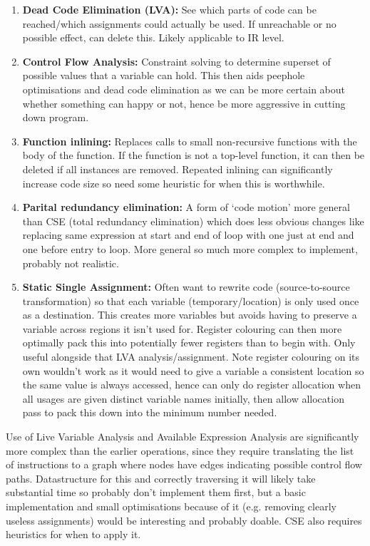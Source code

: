 \documentclass[10pt,twoside,a4paper]{article}
\begin{document}
\begin{enumerate}
\item \textbf{Dead Code Elimination (LVA): }See which parts of code can be reached/which assignments could actually be used. If unreachable or no possible effect, can delete this. Likely applicable to IR level.

\item \textbf{Control Flow Analysis: } Constraint solving to determine superset of possible values that a variable can hold. This then aids peephole optimisations and dead code elimination as we can be more certain about whether something can happy or not, hence be more aggressive in cutting down program.

\item \textbf{Function inlining: } Replaces calls to small non-recursive functions with the body of the function. If the function is not a top-level function, it can then be deleted if all instances are removed. Repeated inlining can significantly increase code size so need some heuristic for when this is worthwhile.

\item \textbf{Parital redundancy elimination: } A form of `code motion' more general than CSE (total redundancy elimination) which does less obvious changes like replacing same expression at start and end of loop with one just at end and one before entry to loop. More general so much more complex to implement, probably not realistic. 

\item \textbf{Static Single Assignment: }Often want to rewrite code (source-to-source transformation) so that each variable (temporary/location) is only used once as a destination. This creates more variables but avoids having to preserve a variable across regions it isn't used for. Register colouring can then more optimally pack this into potentially fewer registers than to begin with. Only useful alongside that LVA analysis/assignment. Note register colouring on its own wouldn't work as it would need to give a variable a consistent location so the same value is always accessed, hence can only do register allocation when all usages are given distinct variable names initially, then allow allocation pass to pack this down into the minimum number needed.
\end{enumerate}

Use of Live Variable Analysis and Available Expression Analysis are significantly more complex than the earlier operations, since they require translating the list of instructions to a graph where nodes have edges indicating possible control flow paths. Datastructure for this and correctly traversing it will likely take substantial time so probably don't implement them first, but a basic implementation and small optimisations because of it (e.g. removing clearly useless assignments) would be interesting and probably doable. CSE also requires heuristics for when to apply it.
\end{document}
